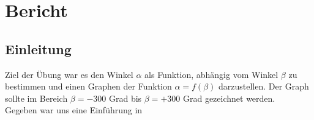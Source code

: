 \section{Bericht}

\subsection{Einleitung}
Ziel der Übung war es den Winkel $\alpha$ als Funktion, abhängig vom Winkel $\beta$ zu bestimmen und einen Graphen der Funktion $\alpha = f(\beta)$ darzustellen. Der Graph sollte im Bereich $\beta = -300$ Grad bis $\beta = +300$ Grad gezeichnet werden. \\
Gegeben war uns eine Einführung in 



 
 
 
 
 
